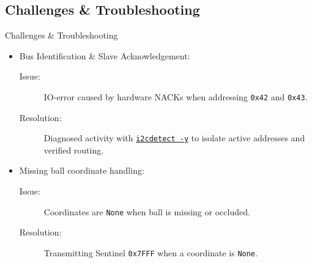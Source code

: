 \subsection{Challenges \& Troubleshooting}\label{subsection:i2c_challenges}
\begin{frame}{Challenges \& Troubleshooting}
    \begin{itemize}
        \item Bus Identification \& Slave Acknowledgement:
        \begin{description}
            \item[Issue:] IO-error caused by hardware NACKs when addressing \texttt{0x42} and \texttt{0x43}.
            \item[Resolution:] Diagnosed activity with \texttt{\href{https://manpages.ubuntu.com/manpages/bionic/man8/i2cdetect.8.html}{i2cdetect -y}} to isolate active addresses and verified routing.
        \end{description}
        \item Missing ball coordinate handling:
        \begin{description}
            \item[Issue:] Coordinates are \texttt{None} when ball is missing or occluded.
            \item[Resolution:] Transmitting Sentinel \texttt{0x7FFF} when a coordinate is \texttt{None}.
        \end{description}
    \end{itemize}
\end{frame}